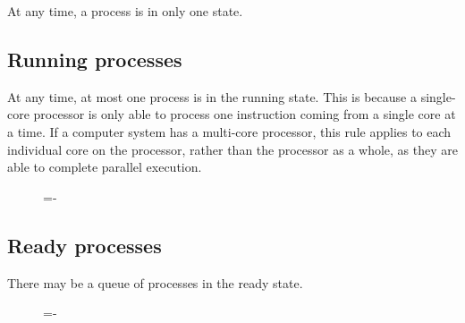 \documentclass[a4paper]{systems-software}
\begin{document}
At any time, a process is in only one state.


\subsection*{Running processes}

At any time, at most one process is in the running state. This is because a single-core processor is only able to process one instruction coming from a single core at a time. If a computer system has a multi-core processor, this rule applies to each individual core on the processor, rather than the processor as a whole, as they are able to complete parallel execution.

\begin{figure}[H]
  \lineskip=-\fboxrule
\end{figure}


\subsection*{Ready processes}

There may be a queue of processes in the ready state.

\begin{figure}[H]
  \lineskip=-\fboxrule
\end{figure}
\end{document}
